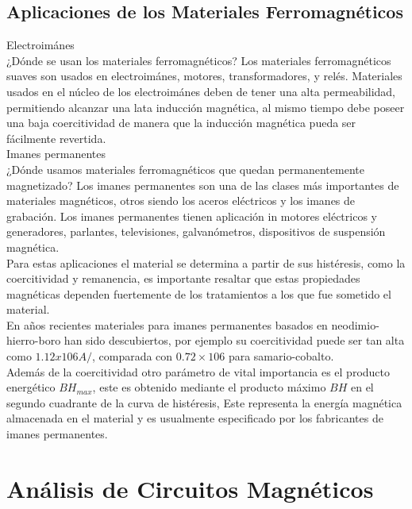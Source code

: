 \subsection{Aplicaciones de los Materiales Ferromagnéticos}

Electroimánes\\
¿Dónde se usan los materiales ferromagnéticos?
Los materiales ferromagnéticos suaves son usados en electroimánes, motores, transformadores, y relés. Materiales usados en el núcleo de los electroimánes deben de tener una alta permeabilidad, permitiendo alcanzar una lata inducción magnética, al mismo tiempo debe poseer una baja coercitividad de manera que la inducción magnética pueda ser fácilmente revertida.\\
Imanes permanentes\\
¿Dónde usamos materiales ferromagnéticos que quedan permanentemente magnetizado?
Los imanes permanentes son una de las clases más importantes de materiales magnéticos, otros siendo los aceros eléctricos y los imanes de grabación. Los imanes permanentes tienen aplicación in motores eléctricos y generadores, parlantes, televisiones, galvanómetros, dispositivos de suspensión magnética.\\
Para estas aplicaciones el material se  determina a partir de sus histéresis, como la coercitividad y remanencia, es importante resaltar que estas propiedades magnéticas dependen fuertemente de los tratamientos a los que fue sometido el material.\\
En años recientes materiales para imanes permanentes basados en neodimio-hierro-boro han sido descubiertos,  por ejemplo su coercitividad puede ser tan alta como $1.12x106 A/$, comparada con $0.72\times 106$ para samario-cobalto.\\
Además de la coercitividad otro parámetro de vital importancia es el producto energético $BH_{max}$, este es obtenido mediante el producto máximo $BH$ en el segundo cuadrante  de la curva de histéresis,  Este representa la energía magnética almacenada en el material y es usualmente especificado por los fabricantes de imanes permanentes.

\section{Análisis de Circuitos Magnéticos}
\label{sec:related:sec3}

